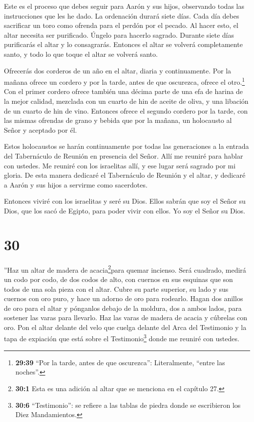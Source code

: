  Este es el proceso que debes seguir para Aarón y sus
hijos, observando todas las instrucciones que les he dado. La ordenación
durará siete días.  Cada día debes sacrificar un toro como
ofrenda para el perdón por el pecado. Al hacer esto, el altar necesita
ser purificado. Úngelo para hacerlo sagrado.  Durante siete
días purificarás el altar y lo consagrarás. Entonces el altar se volverá
completamente santo, y todo lo que toque el altar se volverá santo.

 Ofrecerás dos corderos de un año en el altar, diaria y
continuamente.  Por la mañana ofrece un cordero y por la
tarde, antes de que oscurezca, ofrece el otro.\footnote{\textbf{29:39}
  ``Por la tarde, antes de que oscurezca'': Literalmente, ``entre las
  noches''.}  Con el primer cordero ofrece también una
décima parte de una efa de harina de la mejor calidad, mezclada con un
cuarto de hin de aceite de oliva, y una libación de un cuarto de hin de
vino.  Entonces ofrece el segundo cordero por la tarde, con
las mismas ofrendas de grano y bebida que por la mañana, un holocausto
al Señor y aceptado por él.

 Estos holocaustos se harán continuamente por todas las
generaciones a la entrada del Tabernáculo de Reunión en presencia del
Señor. Allí me reuniré para hablar con ustedes.  Me reuniré
con los israelitas allí, y ese lugar será sagrado por mi gloria.
 De esta manera dedicaré el Tabernáculo de Reunión y el
altar, y dedicaré a Aarón y sus hijos a servirme como sacerdotes.

 Entonces viviré con los israelitas y seré su Dios.
 Ellos sabrán que soy el Señor su Dios, que los sacó de
Egipto, para poder vivir con ellos. Yo soy el Señor su Dios.

\hypertarget{section-29}{%
\section{30}\label{section-29}}

 ''Haz un altar de madera de acacia\footnote{\textbf{30:1}
  Esta es una adición al altar que se menciona en el capítulo 27.}para
quemar incienso.  Será cuadrado, medirá un codo por codo, de
dos codos de alto, con cuernos en sus esquinas que son todos de una sola
pieza con el altar.  Cubre su parte superior, su lado y sus
cuernos con oro puro, y hace un adorno de oro para rodearlo.
 Hagan dos anillos de oro para el altar y pónganlos debajo
de la moldura, dos a ambos lados, para sostener las varas para llevarlo.
 Haz las varas de madera de acacia y cúbrelas con oro.
 Pon el altar delante del velo que cuelga delante del Arca
del Testimonio y la tapa de expiación que está sobre el
Testimonio\footnote{\textbf{30:6} ``Testimonio'': se refiere a las
  tablas de piedra donde se escribieron los Diez Mandamientos.} donde me
reuniré con ustedes.

